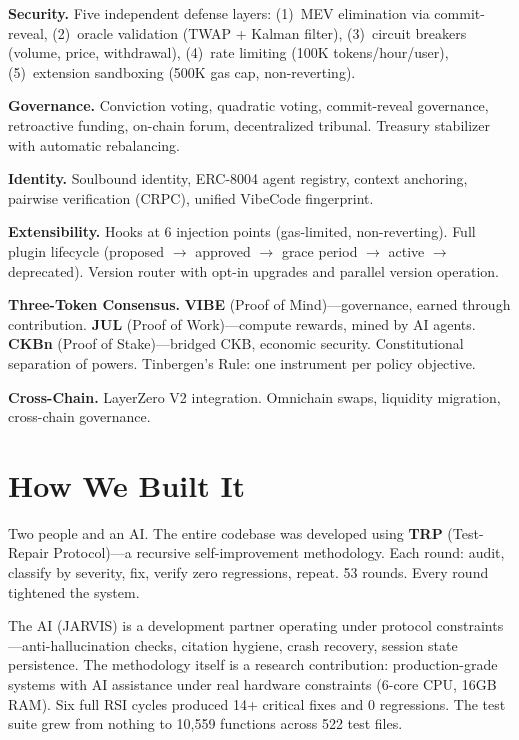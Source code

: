 \documentclass[10pt, letterpaper]{article}
\newcommand{\sub}[1]{\textbf{#1}\enspace}
\begin{document}
\sub{Security.} Five independent defense layers: (1)~MEV elimination via commit-reveal, (2)~oracle validation (TWAP + Kalman filter), (3)~circuit breakers (volume, price, withdrawal), (4)~rate limiting (100K tokens/hour/user), (5)~extension sandboxing (500K gas cap, non-reverting).

\sub{Governance.} Conviction voting, quadratic voting, commit-reveal governance, retroactive funding, on-chain forum, decentralized tribunal. Treasury stabilizer with automatic rebalancing.

\sub{Identity.} Soulbound identity, ERC-8004 agent registry, context anchoring, pairwise verification (CRPC), unified VibeCode fingerprint.

\sub{Extensibility.} Hooks at 6 injection points (gas-limited, non-reverting). Full plugin lifecycle (proposed $\to$ approved $\to$ grace period $\to$ active $\to$ deprecated). Version router with opt-in upgrades and parallel version operation.

\sub{Three-Token Consensus.} \textbf{VIBE} (Proof of Mind)---governance, earned through contribution. \textbf{JUL} (Proof of Work)---compute rewards, mined by AI agents. \textbf{CKBn} (Proof of Stake)---bridged CKB, economic security. Constitutional separation of powers. Tinbergen's Rule: one instrument per policy objective.

\sub{Cross-Chain.} LayerZero V2 integration. Omnichain swaps, liquidity migration, cross-chain governance.


\section{How We Built It}

Two people and an AI. The entire codebase was developed using \textbf{TRP} (Test-Repair Protocol)---a recursive self-improvement methodology. Each round: audit, classify by severity, fix, verify zero regressions, repeat. 53 rounds. Every round tightened the system.

The AI (JARVIS) is a development partner operating under protocol constraints---anti-hallucination checks, citation hygiene, crash recovery, session state persistence. The methodology itself is a research contribution: production-grade systems with AI assistance under real hardware constraints (6-core CPU, 16GB RAM). Six full RSI cycles produced 14+ critical fixes and 0 regressions. The test suite grew from nothing to 10{,}559 functions across 522 test files.
\end{document}
